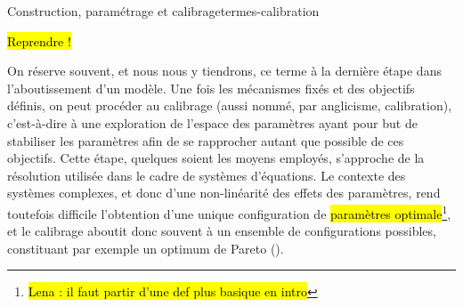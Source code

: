 \begin{encadre}{Construction, paramétrage et calibrage}{termes-calibration}
	\renewcommand{\thempfootnote}{\alph{mpfootnote}}
	\begin{center}
		\hl{Reprendre !}
	\end{center}
	
	\begin{description}[style=nextline]	
		\item[Construction]
		
		\item[Paramétrage]
		
		\item[Calibrage] On réserve souvent, et nous nous y tiendrons, ce terme à la dernière étape dans l'aboutissement d'un modèle.
		Une fois les mécanismes fixés et des objectifs définis, on peut procéder au calibrage (aussi nommé, par anglicisme, \og calibration\fg{}), c'est-à-dire à une exploration de l'espace des paramètres ayant pour but de stabiliser les paramètres afin de se rapprocher autant que possible de ces objectifs.
		Cette étape, quelques soient les moyens employés, s'approche de la résolution utilisée dans le cadre de systèmes d'équations.
		Le contexte des systèmes complexes, et donc d'une non-linéarité des effets des paramètres, rend toutefois difficile l'obtention d'une unique configuration de \hl{paramètres optimale}\footnote{
			\hl{Lena : il faut partir d'une def plus basique en intro}
		}, et le calibrage aboutit donc souvent à un ensemble de configurations possibles, constituant par exemple un optimum de Pareto ().
		
	\end{description}
\end{encadre}

